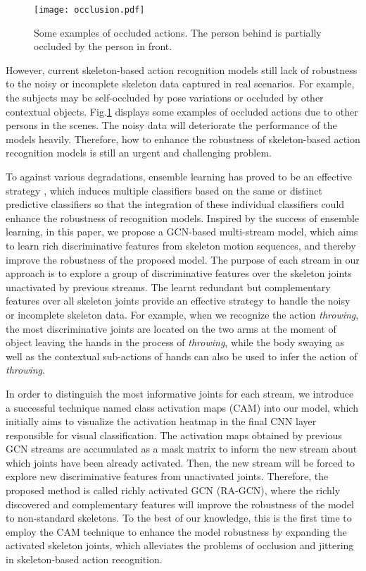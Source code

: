 \documentclass[journal]{IEEEtran}
\begin{document}
\begin{figure}[t]
    \centerline{\texttt{[image: occlusion.pdf]}}
    \caption{Some examples of occluded actions. The person behind is partially occluded by the person in front.}
    \label{fig:occlusion}
\end{figure}

However, current skeleton-based action recognition models still lack of robustness to the noisy or incomplete skeleton data captured in real scenarios. For example, the subjects may be self-occluded by pose variations or occluded by other contextual objects. Fig.\ref{fig:occlusion} displays some examples of occluded actions due to other persons in the scenes. The noisy data will deteriorate the performance of the models heavily. Therefore, how to enhance the robustness of skeleton-based action recognition models is still an urgent and challenging problem.

To against various degradations, ensemble learning has proved to be an effective strategy \cite{krawczyk2017ensemble}, which induces multiple classifiers based on the same or distinct predictive classifiers so that the integration of these individual classifiers could enhance the robustness of recognition models. Inspired by the success of ensemble learning, in this paper, we propose a GCN-based multi-stream model, which aims to learn rich discriminative features from skeleton motion sequences, and thereby improve the robustness of the proposed model. The purpose of each stream in our approach is to explore a group of discriminative features over the skeleton joints unactivated by previous streams. The learnt redundant but complementary features over all skeleton joints provide an effective strategy to handle the noisy or incomplete skeleton data. For example, when we recognize the action {\it throwing}, the most discriminative joints are located on the two arms at the moment of object leaving the hands in the process of {\it throwing}, while the body swaying as well as the contextual sub-actions of hands can also be used to infer the action of {\it throwing}.

In order to distinguish the most informative joints for each stream, we introduce a successful technique named class activation maps (CAM) \cite{zhou2016learning} into our model, which initially aims to visualize the activation heatmap in the final CNN layer responsible for visual classification. The activation maps obtained by previous GCN streams are accumulated as a mask matrix to inform the new stream about which joints have been already activated. Then, the new stream will be forced to explore new discriminative features from unactivated joints. Therefore, the proposed method is called richly activated GCN (RA-GCN), where the richly discovered and complementary features will improve the robustness of the model to non-standard skeletons. To the best of our knowledge, this is the first time to employ the CAM technique to enhance the model robustness by expanding the activated skeleton joints, which alleviates the problems of occlusion and jittering in skeleton-based action recognition.
\end{document}
